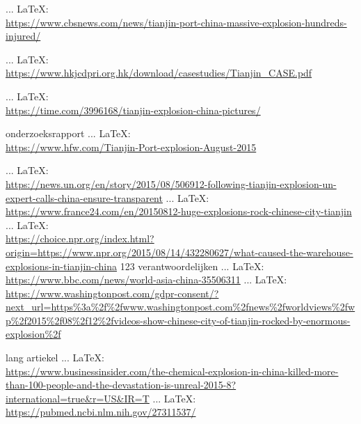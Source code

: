 \begin{thebibliography}{99}
{{{{				 ... \LaTeX:\\ \url{https://www.cbsnews.com/news/tianjin-port-china-massive-explosion-hundreds-injured/}
				
				 ... \LaTeX:\\ \url{https://www.hkjcdpri.org.hk/download/casestudies/Tianjin_CASE.pdf}
				
				 ... \LaTeX:\\ \url{https://time.com/3996168/tianjin-explosion-china-pictures/}
				
				onderzoeksrapport
				 ... \LaTeX:\\ \url{https://www.hfw.com/Tianjin-Port-explosion-August-2015}
				
				 ... \LaTeX:\\ \url{https://news.un.org/en/story/2015/08/506912-following-tianjin-explosion-un-expert-calls-china-ensure-transparent}
				 ... \LaTeX:\\ \url{https://www.france24.com/en/20150812-huge-explosions-rock-chinese-city-tianjin}
				 ... \LaTeX:\\ \url{https://choice.npr.org/index.html?origin=https://www.npr.org/2015/08/14/432280627/what-caused-the-warehouse-explosions-in-tianjin-china}
				123 verantwoordelijken
				 ... \LaTeX:\\ \url{https://www.bbc.com/news/world-asia-china-35506311}
				 ... \LaTeX:\\ \url{https://www.washingtonpost.com/gdpr-consent/?next_url=https%3a%2f%2fwww.washingtonpost.com%2fnews%2fworldviews%2fwp%2f2015%2f08%2f12%2fvideos-show-chinese-city-of-tianjin-rocked-by-enormous-explosion%2f}
				
				lang artiekel
				 ... \LaTeX:\\ \url{https://www.businessinsider.com/the-chemical-explosion-in-china-killed-more-than-100-people-and-the-devastation-is-unreal-2015-8?international=true&r=US&IR=T}
				 ... \LaTeX:\\ \url{https://pubmed.ncbi.nlm.nih.gov/27311537/}
				
}}}}
\end{thebibliography}
